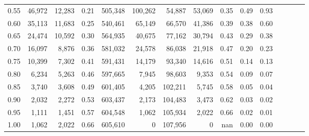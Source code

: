 \begin{tabular}{rrrcrrrrrrrrrrr}
0.55 &  46,972 &  12,283 &                                       0.21 &  505,348 &  100,262 &   54,887 &   53,069 &  0.35 &  0.49 &                         0.93 \\
0.60 &  35,113 &  11,683 &                                       0.25 &  540,461 &   65,149 &   66,570 &   41,386 &  0.39 &  0.38 &                         0.60 \\
0.65 &  24,474 &  10,592 &                                       0.30 &  564,935 &   40,675 &   77,162 &   30,794 &  0.43 &  0.29 &                         0.38 \\
0.70 &  16,097 &   8,876 &                                       0.36 &  581,032 &   24,578 &   86,038 &   21,918 &  0.47 &  0.20 &                         0.23 \\
0.75 &  10,399 &   7,302 &                                       0.41 &  591,431 &   14,179 &   93,340 &   14,616 &  0.51 &  0.14 &                         0.13 \\
0.80 &   6,234 &   5,263 &                                       0.46 &  597,665 &    7,945 &   98,603 &    9,353 &  0.54 &  0.09 &                         0.07 \\
0.85 &   3,740 &   3,608 &                                       0.49 &  601,405 &    4,205 &  102,211 &    5,745 &  0.58 &  0.05 &                         0.04 \\
0.90 &   2,032 &   2,272 &                                       0.53 &  603,437 &    2,173 &  104,483 &    3,473 &  0.62 &  0.03 &                         0.02 \\
0.95 &   1,111 &   1,451 &                                       0.57 &  604,548 &    1,062 &  105,934 &    2,022 &  0.66 &  0.02 &                         0.01 \\
1.00 &   1,062 &   2,022 &                                       0.66 &  605,610 &        0 &  107,956 &        0 &   nan &  0.00 &                         0.00 \\
\bottomrule
\end{tabular}
